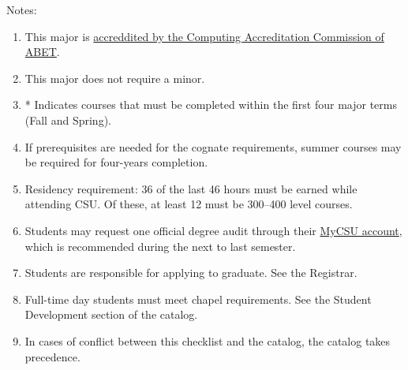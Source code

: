 Notes:%
\begin{enumerate}\footnotesize
	\item This major is
		\href{https://www.abet.org/accreditation/what-is-accreditation/why-abet-accreditation-matters/}{accreddited by the Computing Accreditation Commission of ABET}.
	\item This major does not require a minor.
	\item * Indicates courses that must be completed within the first four major terms (Fall and Spring).
	\item If prerequisites are needed for the cognate requirements, summer courses may be required for four-years completion.
	\item Residency requirement: 36 of the last 46 hours must be earned while attending CSU. Of these, at least 12 must be 300--400 level courses.
	\item Students may request one official degree audit through their \href{https://portal.csuniv.edu/}{MyCSU account}, which is recommended during the next to last semester.
	\item Students are responsible for applying to graduate. See the Registrar.
	\item Full-time day students must meet chapel requirements. See the Student Development section of the catalog.
	\item In cases of conflict between this checklist and the catalog, the catalog takes precedence.
\end{enumerate}